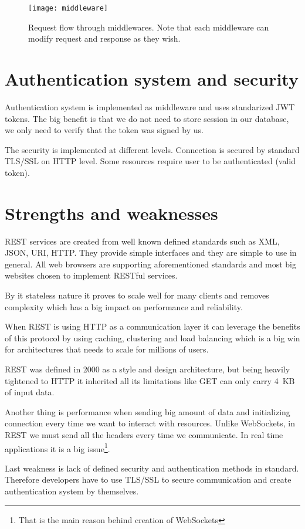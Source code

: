 \begin{figure}[!htbp]
\centering
\texttt{[image: middleware]}
\caption[Request flow through middlewares]{Request flow through middlewares. Note that each middleware can modify request and response as they wish.}
\label{fig:middleware}
\end{figure}

\section{Authentication system and security}
Authentication system is implemented as middleware and uses standarized JWT tokens\cite{JWT-rfc}. The big benefit is that we do not need to store session in our database, we only need to verify that the token was signed by us.

The security is implemented at different levels. Connection is secured by standard TLS/SSL on HTTP level. Some resources require user to be authenticated (valid token).


\section{Strengths and weaknesses}
REST services are created from well known defined standards such as XML, JSON, URI, HTTP\@. They provide simple interfaces and they are simple to use in general. All web browsers are supporting aforementioned standards and most big websites chosen to implement RESTful services.

By it stateless nature it proves to scale well for many clients and removes complexity which has a big impact on performance and reliability.

When REST is using HTTP as a communication layer it can leverage the benefits of this protocol by using caching, clustering and load balancing which is a big win for architectures that needs to scale for millions of users.

REST was defined in 2000\cite{REST-wiki} as a style and design architecture, but being heavily tightened to HTTP it inherited all its limitations like GET can only carry 4~KB of input data\cite[p.~3]{restful-web-services}.

Another thing is performance when sending big amount of data and initializing connection every time we want to interact with resources. Unlike WebSockets, in REST we must send all the headers every time we communicate. In real time applications it is a big issue\footnote{That is the main reason behind creation of WebSockets}.

Last weakness is lack of defined security and authentication methods in standard. Therefore developers have to use TLS/SSL to secure communication and create authentication system by themselves.
